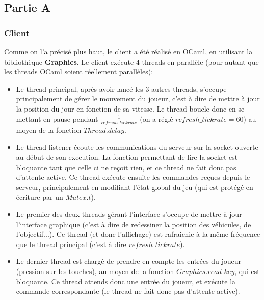 \documentclass{article}
\begin{document}
\subsection{Partie A}

\subsubsection{Client}
Comme on l'a précisé plus haut, le client a été réalisé en OCaml, en utilisant la bibliothèque \textbf{Graphics}. Le client exécute 4 threads en parallèle (pour autant que les threads OCaml soient réellement parallèles):
\begin{itemize}
  \item Le thread principal, après avoir lancé les 3 autres threads, s'occupe principalement de gérer le mouvement du joueur, c'est à dire de mettre à jour la position du jour en fonction de sa vitesse. Le thread boucle donc en se mettant en pause pendant $\frac{1}{refresh\_tickrate}$ (on a réglé $refresh\_tickrate = 60$) au moyen de la fonction $Thread.delay$.
  \item Le thread listener écoute les communications du serveur sur la socket ouverte au début de son execution. La fonction permettant de lire la socket est bloquante tant que celle ci ne reçoit rien, et ce thread ne fait donc pas d'attente active. Ce thread exécute ensuite les commandes reçues depuis le serveur, principalement en modifiant l'état global du jeu (qui est protégé en écriture par un $Mutex.t$).
  \item Le premier des deux threads gérant l'interface s'occupe de mettre à jour l'interface graphique (c'est à dire de redessiner la position des véhicules, de l'objectif...). Ce thread (et donc l'affichage) est rafraichie à la même fréquence que le thread principal (c'est à dire $refresh\_tickrate$).
  \item Le dernier thread est chargé de prendre en compte les entrées du joueur (pression sur les touches), au moyen de la fonction $Graphics.read\_key$, qui est bloquante. Ce thread attends donc une entrée du joueur, et exécute la commande correspondante (le thread ne fait donc pas d'attente active).
\end{itemize}
\end{document}
